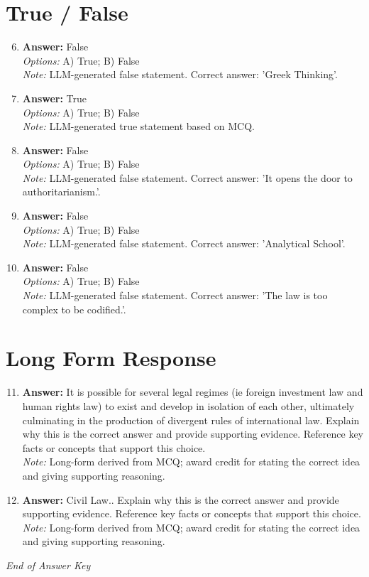 \documentclass[12pt]{article}
\begin{document}
\section*{True / False}
\begin{enumerate}[label=\arabic*.]
\setcounter{enumi}{5}
\item \textbf{Answer:} False
\\ \textit{Options:} A) True; B) False
\\ \textit{Note:} LLM-generated false statement. Correct answer: 'Greek Thinking'.
\item \textbf{Answer:} True
\\ \textit{Options:} A) True; B) False
\\ \textit{Note:} LLM-generated true statement based on MCQ.
\item \textbf{Answer:} False
\\ \textit{Options:} A) True; B) False
\\ \textit{Note:} LLM-generated false statement. Correct answer: 'It opens the door to authoritarianism.'.
\item \textbf{Answer:} False
\\ \textit{Options:} A) True; B) False
\\ \textit{Note:} LLM-generated false statement. Correct answer: 'Analytical School'.
\item \textbf{Answer:} False
\\ \textit{Options:} A) True; B) False
\\ \textit{Note:} LLM-generated false statement. Correct answer: 'The law is too complex to be codified.'.
\end{enumerate}

\section*{Long Form Response}
\begin{enumerate}[label=\arabic*.]
\setcounter{enumi}{10}
\item \textbf{Answer:} It is possible for several legal regimes (ie foreign investment law and human rights law) to exist and develop in isolation of each other, ultimately culminating in the production of divergent rules of international law. Explain why this is the correct answer and provide supporting evidence. Reference key facts or concepts that support this choice.
\\ \textit{Note:} Long-form derived from MCQ; award credit for stating the correct idea and giving supporting reasoning.
\item \textbf{Answer:} Civil Law.. Explain why this is the correct answer and provide supporting evidence. Reference key facts or concepts that support this choice.
\\ \textit{Note:} Long-form derived from MCQ; award credit for stating the correct idea and giving supporting reasoning.
\end{enumerate}

\vfill
\noindent\textit{End of Answer Key}
\end{document}
